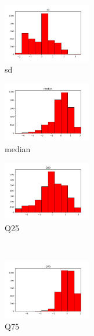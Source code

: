 \documentclass[a4paper]{article}    %
\begin{document}

\begin{figure}[H]
    \centering
    \begin{subfigure}{0.32\textwidth}
        \centering
        \includegraphics[width=3.85cm]{std_0_sd}
        \caption{sd}
        \label{fig:sub_std_1}
    \end{subfigure}
    \hfill
    \begin{subfigure}{0.32\textwidth}
        \centering
        \includegraphics[width=3.85cm]{std_1_median}
        \caption{median}
        \label{fig:sub_std_2}
    \end{subfigure}
    \hfill
    \begin{subfigure}{0.32\textwidth}
        \centering
        \includegraphics[width=3.85cm]{std_2_Q25}
        \caption{Q25}
        \label{fig:sub_std_3}
    \end{subfigure}%
    \\
    \begin{subfigure}{0.32\textwidth}
        \centering
        \includegraphics[width=3.85cm]{std_3_Q75}
        \caption{Q75}
        \label{fig:sub_std_4}
    \end{subfigure}\hfill
    \begin{subfigure}{0.32\textwidth}
        \centering

\end{subfigure}
\end{figure}
\end{document}
